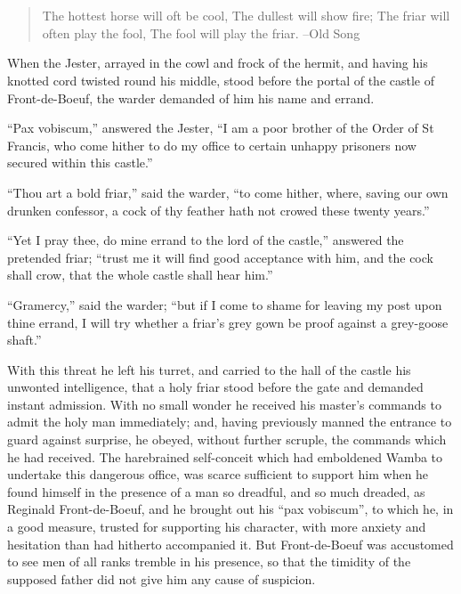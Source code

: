 \chapter{}

\begin{quote}
The hottest horse will oft be cool,
The dullest will show fire;
The friar will often play the fool,
The fool will play the friar.
--Old Song
\end{quote}

When the Jester, arrayed in the cowl and frock of the hermit, and having
his knotted cord twisted round his middle, stood before the portal of
the castle of Front-de-Boeuf, the warder demanded of him his name and
errand.

``Pax vobiscum,'' answered the Jester, ``I am a poor brother of the
Order of St Francis, who come hither to do my office to certain unhappy
prisoners now secured within this castle.''

``Thou art a bold friar,'' said the warder, ``to come hither, where,
saving our own drunken confessor, a cock of thy feather hath not crowed
these twenty years.''

``Yet I pray thee, do mine errand to the lord of the castle,'' answered
the pretended friar; ``trust me it will find good acceptance with him,
and the cock shall crow, that the whole castle shall hear him.''

``Gramercy,'' said the warder; ``but if I come to shame for leaving my
post upon thine errand, I will try whether a friar's grey gown be proof
against a grey-goose shaft.''

With this threat he left his turret, and carried to the hall of the
castle his unwonted intelligence, that a holy friar stood before the
gate and demanded instant admission. With no small wonder he received
his master's commands to admit the holy man immediately; and, having
previously manned the entrance to guard against surprise, he obeyed,
without further scruple, the commands which he had received. The
harebrained self-conceit which had emboldened Wamba to undertake this
dangerous office, was scarce sufficient to support him when he found
himself in the presence of a man so dreadful, and so much dreaded, as
Reginald Front-de-Boeuf, and he brought out his ``pax vobiscum'', to
which he, in a good measure, trusted for supporting his character, with
more anxiety and hesitation than had hitherto accompanied it. But
Front-de-Boeuf was accustomed to see men of all ranks tremble in his
presence, so that the timidity of the supposed father did not give him
any cause of suspicion.

